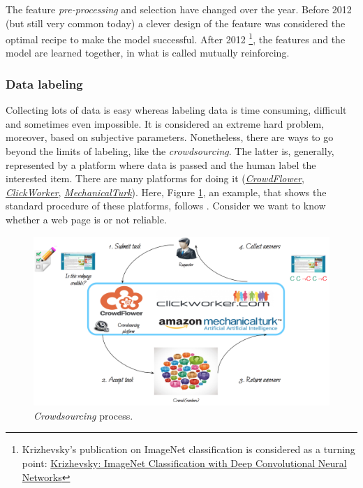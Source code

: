 The feature \emph{pre-processing} and selection have changed over the year. Before 2012 (but still very common today) a clever design of the feature was considered the optimal recipe to make the model successful. After 2012 \footnote{Krizhevsky's publication on ImageNet classification is considered as a turning point: \href{https://papers.nips.cc/paper/4824-imagenet-classification-with-deep-convolutional-neural-networks.pdf}{Krizhevsky: ImageNet Classification with Deep Convolutional Neural Networks}}, 
the features and the model are learned together, in what is called mutually reinforcing.

\subsubsection{Data labeling}

Collecting lots of data is easy whereas labeling data is time consuming, difficult and sometimes even impossible. It is considered an extreme hard problem, moreover, based on subjective parameters. Nonetheless, there are ways to go beyond the limits of labeling, like the \emph{crowdsourcing}. The latter is, generally, represented by a platform where data is passed and the human label the interested item. There are many platforms for doing it (\href{https://en.wikipedia.org/wiki/CrowdFlower}{\emph{CrowdFlower}}, \href{https://www.clickworker.com}{\emph{ClickWorker}}, \href{https://en.wikipedia.org/wiki/Amazon_Mechanical_Turk}{\emph{MechanicalTurk}}).  Here, Figure \ref{pic:crowdsourcing}, an example, that shows the standard procedure of these platforms, follows . Consider we want to know whether a web page is or not reliable.  

\begin{figure}[H]%
 \centering
 \includegraphics[width=13cm]{./img/08/crowdsourcing}
 \caption{\label{pic:crowdsourcing} \emph{Crowdsourcing} process.}
\end{figure}


